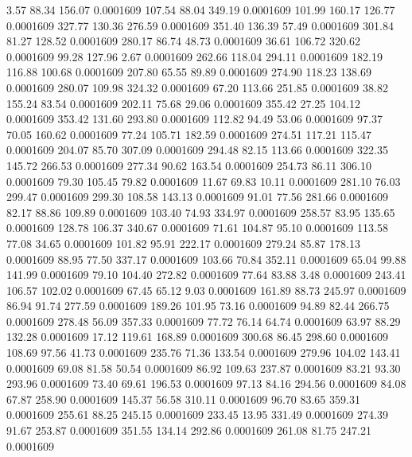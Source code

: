    3.57   88.34  156.07   0.0001609
 107.54   88.04  349.19   0.0001609
 101.99  160.17  126.77   0.0001609
 327.77  130.36  276.59   0.0001609
 351.40  136.39   57.49   0.0001609
 301.84   81.27  128.52   0.0001609
 280.17   86.74   48.73   0.0001609
  36.61  106.72  320.62   0.0001609
  99.28  127.96    2.67   0.0001609
 262.66  118.04  294.11   0.0001609
 182.19  116.88  100.68   0.0001609
 207.80   65.55   89.89   0.0001609
 274.90  118.23  138.69   0.0001609
 280.07  109.98  324.32   0.0001609
  67.20  113.66  251.85   0.0001609
  38.82  155.24   83.54   0.0001609
 202.11   75.68   29.06   0.0001609
 355.42   27.25  104.12   0.0001609
 353.42  131.60  293.80   0.0001609
 112.82   94.49   53.06   0.0001609
  97.37   70.05  160.62   0.0001609
  77.24  105.71  182.59   0.0001609
 274.51  117.21  115.47   0.0001609
 204.07   85.70  307.09   0.0001609
 294.48   82.15  113.66   0.0001609
 322.35  145.72  266.53   0.0001609
 277.34   90.62  163.54   0.0001609
 254.73   86.11  306.10   0.0001609
  79.30  105.45   79.82   0.0001609
  11.67   69.83   10.11   0.0001609
 281.10   76.03  299.47   0.0001609
 299.30  108.58  143.13   0.0001609
  91.01   77.56  281.66   0.0001609
  82.17   88.86  109.89   0.0001609
 103.40   74.93  334.97   0.0001609
 258.57   83.95  135.65   0.0001609
 128.78  106.37  340.67   0.0001609
  71.61  104.87   95.10   0.0001609
 113.58   77.08   34.65   0.0001609
 101.82   95.91  222.17   0.0001609
 279.24   85.87  178.13   0.0001609
  88.95   77.50  337.17   0.0001609
 103.66   70.84  352.11   0.0001609
  65.04   99.88  141.99   0.0001609
  79.10  104.40  272.82   0.0001609
  77.64   83.88    3.48   0.0001609
 243.41  106.57  102.02   0.0001609
  67.45   65.12    9.03   0.0001609
 161.89   88.73  245.97   0.0001609
  86.94   91.74  277.59   0.0001609
 189.26  101.95   73.16   0.0001609
  94.89   82.44  266.75   0.0001609
 278.48   56.09  357.33   0.0001609
  77.72   76.14   64.74   0.0001609
  63.97   88.29  132.28   0.0001609
  17.12  119.61  168.89   0.0001609
 300.68   86.45  298.60   0.0001609
 108.69   97.56   41.73   0.0001609
 235.76   71.36  133.54   0.0001609
 279.96  104.02  143.41   0.0001609
  69.08   81.58   50.54   0.0001609
  86.92  109.63  237.87   0.0001609
  83.21   93.30  293.96   0.0001609
  73.40   69.61  196.53   0.0001609
  97.13   84.16  294.56   0.0001609
  84.08   67.87  258.90   0.0001609
 145.37   56.58  310.11   0.0001609
  96.70   83.65  359.31   0.0001609
 255.61   88.25  245.15   0.0001609
 233.45   13.95  331.49   0.0001609
 274.39   91.67  253.87   0.0001609
 351.55  134.14  292.86   0.0001609
 261.08   81.75  247.21   0.0001609
